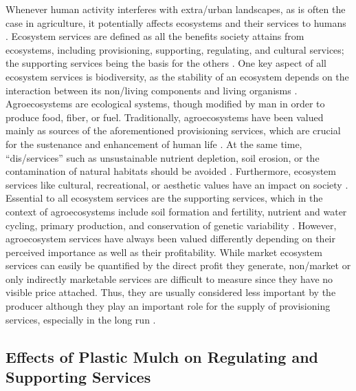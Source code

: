 Whenever human activity interferes with extra\-/urban landscapes, as is often the case in agriculture, it potentially affects ecosystems and their services to humans \citep{FoleyGlobal2005}. Ecosystem services are defined as all the benefits society attains from ecosystems, including provisioning, supporting, regulating, and cultural services; the supporting services being the basis for the others \citep{MillenniumEcosystemAssessmentEcosystems2005}. One key aspect of all ecosystem services is biodiversity, as the stability of an ecosystem depends on the interaction between its non\-/living components and living organisms \citep{Haines-YoungLinks2010}. Agroecosystems are ecological systems, though modified by man in order to produce food, fiber, or fuel.
Traditionally, agroecosystems have been valued mainly as sources of the aforementioned provisioning services, which are crucial for the sustenance and enhancement of human life \citep{PowerEcosystem2010}. At the same time, ``dis\-/services'' such as unsustainable nutrient depletion, soil erosion, or the contamination of natural habitats should be avoided \citep{ZhangEcosystem2007}. Furthermore, ecosystem services like cultural, recreational, or aesthetic values have an impact on society \citep{UlrichHuman1986}. Essential to all ecosystem services are the supporting services, which in the context of agroecosystems include soil formation and fertility, nutrient and water cycling, primary production, and conservation of genetic variability \citep{MillenniumEcosystemAssessmentEcosystems2005}. However, agroecosystem services have always been valued differently depending on their perceived importance as well as their profitability. While market ecosystem services can easily be quantified by the direct profit they generate, non\-/market or only indirectly marketable services are difficult to measure since they have no visible price attached. Thus, they are usually considered less important by the producer although they play an important role for the supply of provisioning services, especially in the long run \citep{SwintonEcosystem2007}.

\subsection{Effects of Plastic Mulch on Regulating and Supporting Services}

